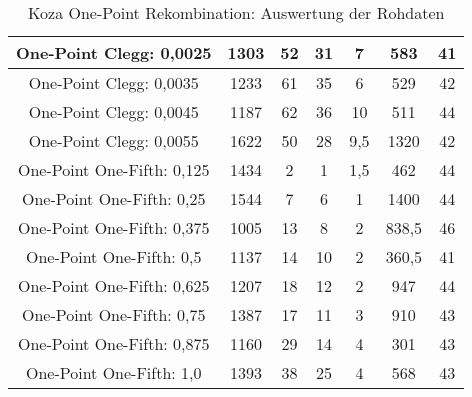 \begin{table}[H]
\begin{tabular}{c | c | c | c | c | c | c}
		\hline
		One-Point Clegg: 0,0025 & 1303 & 52 & 31 & 7 & 583 & 41\\
		\hline
		One-Point Clegg: 0,0035 & 1233 & 61 & 35 & 6 & 529 & 42\\
		\hline
		One-Point Clegg: 0,0045 & 1187 & 62 & 36 & 10 & 511 & 44\\
		\hline
		One-Point Clegg: 0,0055 & 1622 & 50 & 28 & 9,5 & 1320 & 42\\
		\hline
		\hline
		One-Point One-Fifth: 0,125 & 1434 & 2 & 1 & 1,5 & 462 & 44\\
		\hline
		One-Point One-Fifth: 0,25 & 1544 & 7 & 6 & 1 & 1400 & 44\\
		\hline
		One-Point One-Fifth: 0,375 & 1005 & 13 & 8 & 2 & 838,5 & 46\\
		\hline
		One-Point One-Fifth: 0,5 & 1137 & 14 & 10 & 2 & 360,5 & 41\\
		\hline
		One-Point One-Fifth: 0,625 & 1207 & 18 & 12 & 2 & 947 & 44\\
		\hline
		One-Point One-Fifth: 0,75 & 1387 & 17 & 11 & 3 & 910 & 43\\
		\hline
		One-Point One-Fifth: 0,875 & 1160 & 29 & 14 & 4 & 301 & 43\\
		\hline
		One-Point One-Fifth: 1,0 & 1393 & 38 & 25 & 4 & 568 & 43\\
	\end{tabular}
	\caption{Koza One-Point Rekombination: Auswertung der Rohdaten}
	\label{table:kozaOnePointRohdaten}
\end{table} 
